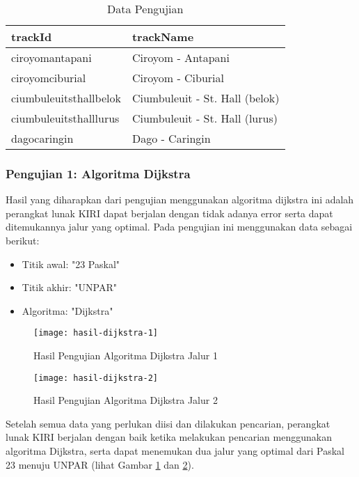 \renewcommand{\arraystretch}{1.8}
\begin{table}[H]
\centering
\caption{Data Pengujian}
\label{tab:data}
{\large
\begin{tabular}{|l|l|}
\hline
\textbf{trackId}       & \textbf{trackName}             \\ \hline
ciroyomantapani & Ciroyom - Antapani \\ \hline
ciroyomciburial & Ciroyom - Ciburial \\ \hline
ciumbuleuitsthallbelok   & Ciumbuleuit - St. Hall (belok)     \\ \hline
ciumbuleuitsthalllurus        & Ciumbuleuit - St. Hall (lurus)             \\ \hline
dagocaringin        & Dago - Caringin             \\ \hline
\end{tabular}
}
\end{table}

\subsubsection{Pengujian 1: Algoritma Dijkstra}
Hasil yang diharapkan dari pengujian menggunakan algoritma dijkstra ini adalah perangkat lunak KIRI dapat berjalan dengan tidak adanya error serta dapat ditemukannya jalur yang optimal. Pada pengujian ini menggunakan data sebagai berikut:
\begin{itemize}
    \item Titik awal: "23 Paskal"
    \item Titik akhir: "UNPAR"
    \item Algoritma: "Dijkstra"
\end{itemize}

\begin{figure}[H]
    \centering
    \texttt{[image: hasil-dijkstra-1]}
    \caption{Hasil Pengujian Algoritma Dijkstra Jalur 1}
    \label{fig:hasildijkstra-1}
\end{figure}

\begin{figure}[H]
    \centering
    \texttt{[image: hasil-dijkstra-2]}
    \caption{Hasil Pengujian Algoritma Dijkstra Jalur 2}
    \label{fig:hasildijkstra-2}
\end{figure}
\noindent
Setelah semua data yang perlukan diisi dan dilakukan pencarian, perangkat lunak KIRI berjalan dengan baik ketika melakukan pencarian menggunakan algoritma Dijkstra, serta dapat menemukan dua jalur yang optimal dari Paskal 23 menuju UNPAR (lihat Gambar \ref{fig:hasildijkstra-1} dan \ref{fig:hasildijkstra-2}).

